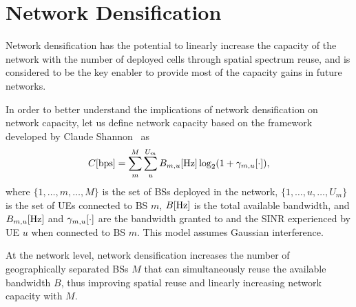\documentclass{IEEEtran}
\begin{document}
\begin{figure*}[t!]
  \centering
  \caption{Average number of active \acp{BS} in the network per square km and average number of active \acp{UE} per active \ac{BS}.
  The \ac{UE} densities are 600, 300 and 100 active \acp{UE} per km$^2$.
  The UE distributions are uniform and non-uniform within the scenario.
  The rest of the parameters are $s=1$, $f=2$\,GHz, $a=1$ and $t=$12\,dB.}
\label{fig:activeCellsAndUes}
\end{figure*}











\section{Network Densification}
\label{sec:densification}

Network densification has the potential to linearly increase the capacity of the network with the number of deployed cells
through spatial spectrum reuse,
and is considered to be the key enabler to provide most of the capacity gains in future networks.

In order to better understand the implications of network densification on network capacity,
let us define network capacity based on the framework developed by Claude Shannon~\cite{Shanon1948} as
\begin{equation}
C {\rm [bps]} = \sum_m^M \sum_u^{U_m} B_{m,u} {\rm [Hz]}  \log_2 (1 + \gamma_{m,u} {\rm [\cdot]}),
\label{eq:Shannon}
\end{equation}
where $\{1, \dots, m, \dots, M\}$ is the set of \acp{BS} deployed in the network,
$\{1, \dots, u, \dots, U_m\}$ is the set of \acp{UE} connected to \ac{BS} $m$,
$B {\rm [Hz]}$ is the total available bandwidth,
and $B_{m,u} {\rm [Hz]}$ and $\gamma_{m,u} {\rm [\cdot]}$ are the bandwidth granted to and the \ac{SINR} experienced by
\ac{UE} $u$ when connected to \ac{BS} $m$.
This model assumes Gaussian interference.


At the network level,
network densification increases the number of geographically separated \acp{BS} $M$
that can simultaneously reuse the available bandwidth $B$,
thus improving spatial reuse and linearly increasing network capacity with $M$.
\end{document}
